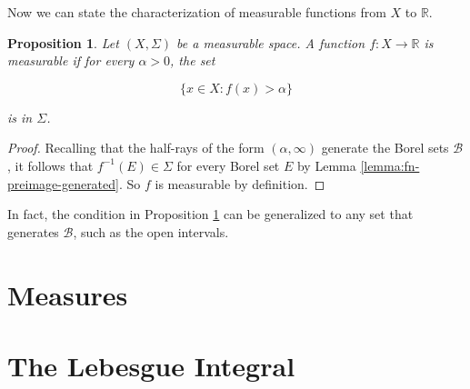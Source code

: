 \documentclass{amsart}
\newcommand{\bbR}{\mathbb{R}}
\newcommand{\Borel}{\mathcal{B}}
\newtheorem{proposition}[theorem]{Proposition}
\begin{document}
Now we can state the characterization of measurable functions from $X$ to $\bbR$.

\begin{proposition}\label{prop:measurable-fn-r}
    Let $(X, \Sigma)$ be a measurable space. A function $f:X \rightarrow \bbR$
    is measurable if for every $\alpha > 0$, the set

    $$\{x \in X : f(x) > \alpha \}$$

    is in $\Sigma$.
\end{proposition}
\begin{proof}
   Recalling that the half-rays of the form $(\alpha, \infty)$ generate the
   Borel sets $\Borel$, it follows that $f^{-1}(E) \in \Sigma$ for every Borel
   set $E$ by Lemma \ref{lemma:fn-preimage-generated}. So $f$ is measurable by definition.
\end{proof}

In fact, the condition in Proposition \ref{prop:measurable-fn-r} can be
generalized to any set that generates $\Borel$, such as the open intervals. 

\newpage

\section{Measures}

\newpage

\section{The Lebesgue Integral}
\end{document}
